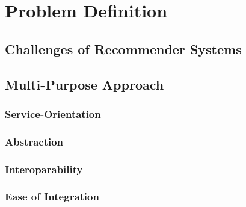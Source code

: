 \chapter{Problem Definition}

\section{Challenges of Recommender Systems}


\section{Multi-Purpose Approach}

\subsection{Service-Orientation}

\subsection{Abstraction}

\subsection{Interoparability}

\subsection{Ease of Integration}